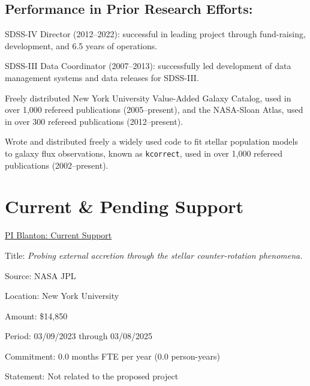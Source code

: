 \documentclass[12pt, preprint]{hacked-aastex}
\newenvironment{ditemize}
{ \begin{list}{}{%
\setlength{\topsep}{0pt}%
\setlength{\partopsep}{3pt}%
\setlength{\itemsep}{1pt}\setlength{\parsep}{1pt}%
\setlength{\itemindent}{0pt}\setlength{\listparindent}{12pt}%
\setlength{\leftmargin}{24pt}\setlength{\rightmargin}{0in}%
\setlength{\labelsep}{6pt}\setlength{\labelwidth}{6pt}%
\renewcommand{\makelabel}{\makebox[\labelwidth][l]{$\bullet$\hspace{\fill}}}}}
{\end{list}}
\begin{document}
\vspace{-8pt}
\subsection*{\normalsize Performance in
  Prior Research Efforts:}
\begin{ditemize}\setlength{\itemsep}{0pt}
\item SDSS-IV Director (2012--2022): successful in leading project
  through fund-raising, development, and 6.5 years of operations. 
\item SDSS-III Data Coordinator (2007--2013): successfully led
  development of data management systems and data releases for
  SDSS-III.
\item Freely distributed New York University Value-Added Galaxy
  Catalog, used in over 1,000 refereed publications (2005--present), and
  the NASA-Sloan Atlas, used in over 300 refereed publications
  (2012--present).
\item Wrote and distributed freely a widely used code to fit stellar
  population models to galaxy flux observations, known as
  \texttt{kcorrect}, used in over 1,000 refereed publications
  (2002--present).
\end{ditemize}


\clearpage
\section{Current \& Pending Support}\label{sec:support}

\noindent \underline{PI Blanton: Current Support}

\begin{itemize*}
\item[]{Title: {\em Probing external accretion  through the stellar
    counter-rotation phenomena.}}
\item[]{Source: NASA JPL}
\item[]{Location: New York University}
\item[]{Amount: \$14,850}
\item[]{Period: 03/09/2023 through 03/08/2025}
\item[]{Commitment: 0.0 months FTE per year (0.0 person-years)}
\item[]{Statement: Not related to the proposed project}
\end{itemize*}
\end{document}
